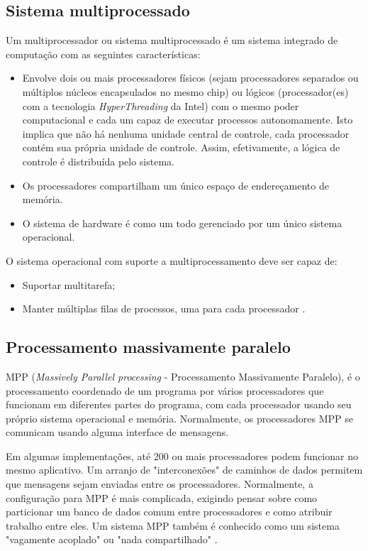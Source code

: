   \subsection{Sistema multiprocessado}\label{multiprocessamento}
  Um multiprocessador ou sistema multiprocessado é um sistema integrado de computação com as seguintes características:
\begin{itemize}
  \item Envolve dois ou mais processadores físicos (sejam processadores separados ou múltiplos núcleos encapsulados no mesmo chip) ou lógicos
   (processador(es) com a tecnologia \textit{HyperThreading} da Intel) com o mesmo poder computacional e cada um capaz de executar processos autonomamente.
   Isto implica que não há nenhuma unidade central de controle, cada processador contém sua própria unidade de controle. Assim, efetivamente, a lógica de controle é distribuída pelo sistema.

  \item Os processadores compartilham um único espaço de endereçamento de memória.
  \item O sistema de hardware é como um todo gerenciado por um único sistema operacional.
\end{itemize}

  O sistema operacional com suporte a multiprocessamento deve ser capaz de:
  \begin{itemize}
    \item Suportar multitarefa;
    \item Manter múltiplas filas de processos, uma para cada processador \cite{os}.

  \end{itemize}

  \subsection{Processamento massivamente paralelo}\label{massivamenteParalelo}
  MPP (\textit{Massively Parallel processing} - Processamento Massivamente Paralelo), é o processamento coordenado
  de um programa por vários processadores que funcionam em diferentes partes do programa,
   com cada processador usando seu próprio sistema operacional e memória.
    Normalmente, os processadores MPP se comunicam usando alguma interface de mensagens.

     Em algumas implementações, até 200 ou mais processadores podem funcionar no mesmo aplicativo.
      Um arranjo de "interconexões" de caminhos de dados permitem que mensagens sejam enviadas entre os processadores.
       Normalmente, a configuração para MPP é mais complicada, exigindo pensar sobre como particionar um banco de dados
        comum entre processadores e como atribuir trabalho entre eles.
         Um sistema MPP também é conhecido como um sistema "vagamente acoplado" ou "nada compartilhado" \cite{mpp}.

